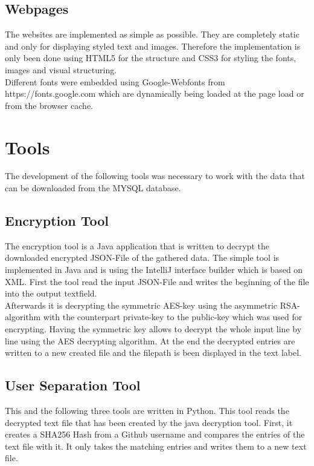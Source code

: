 \subsection{Webpages}
The websites are implemented as simple as possible. They are completely static and only for displaying styled text and images. Therefore the implementation is only been done using HTML5 for the structure and CSS3 for styling the fonts, images and visual structuring.\\
Different fonts were embedded using Google-Webfonts from https://fonts.google.com \cite{fontsGoogle} which are dynamically being loaded at the page load or from the browser cache. 

\section{Tools}
The development of the following tools was necessary to work with the data that can be downloaded from the MYSQL database.

\subsection{Encryption Tool}
The encryption tool is a Java application that is written to decrypt the downloaded encrypted JSON-File of the gathered data.
The simple tool is implemented in Java and is using the IntelliJ interface builder which is based on XML. 
First the tool read the input JSON-File and writes the beginning of the file into the output textfield.\\
Afterwards it is decrypting the symmetric AES-key using the asymmetric RSA-algorithm with the counterpart private-key to the public-key which was used for encrypting. Having the symmetric key allows to decrypt the whole input line by line using the AES decrypting algorithm.
At the end the decrypted entries are written to a new created file and the filepath is been displayed in the text label. 

\subsection{User Separation Tool}
This and the following three tools are written in Python. This tool reads the decrypted text file that has been created by the java decryption tool. First, it creates a SHA256 Hash from a Github username and compares the entries of the text file with it. It only takes the matching entries and writes them to a new text file. 

